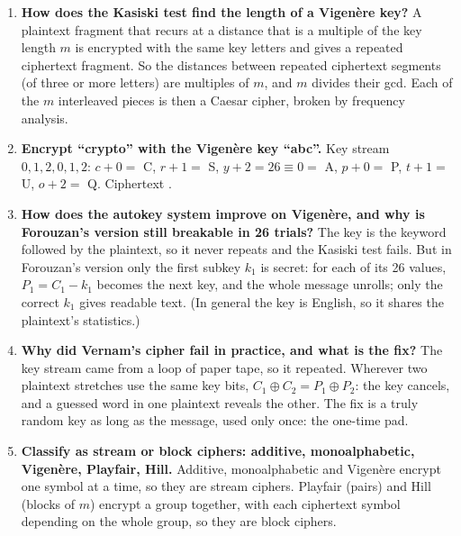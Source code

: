 \begin{enumerate}[leftmargin=1.6em,itemsep=3pt]
  \item \textbf{How does the Kasiski test find the length of a Vigen\`ere key?} A plaintext fragment that recurs at a distance that is a multiple of the key length $m$ is encrypted with the same key letters and gives a repeated ciphertext fragment. So the distances between repeated ciphertext segments (of three or more letters) are multiples of $m$, and $m$ divides their gcd. Each of the $m$ interleaved pieces is then a Caesar cipher, broken by frequency analysis.
  \item \textbf{Encrypt ``crypto'' with the Vigen\`ere key ``abc''.} Key stream $0, 1, 2, 0, 1, 2$: $c{+}0 = $ C, $r{+}1 = $ S, $y{+}2 = 26 \equiv 0 = $ A, $p{+}0 = $ P, $t{+}1 = $ U, $o{+}2 = $ Q. Ciphertext \textbf{}.
  \item \textbf{How does the autokey system improve on Vigen\`ere, and why is Forouzan's version still breakable in 26 trials?} The key is the keyword followed by the plaintext, so it never repeats and the Kasiski test fails. But in Forouzan's version only the first subkey $k_1$ is secret: for each of its 26 values, $P_1 = C_1 - k_1$ becomes the next key, and the whole message unrolls; only the correct $k_1$ gives readable text. (In general the key is English, so it shares the plaintext's statistics.)
  \item \textbf{Why did Vernam's cipher fail in practice, and what is the fix?} The key stream came from a loop of paper tape, so it repeated. Wherever two plaintext stretches use the same key bits, $C_1 \oplus C_2 = P_1 \oplus P_2$: the key cancels, and a guessed word in one plaintext reveals the other. The fix is a truly random key as long as the message, used only once: the one-time pad.
  \item \textbf{Classify as stream or block ciphers: additive, monoalphabetic, Vigen\`ere, Playfair, Hill.} Additive, monoalphabetic and Vigen\`ere encrypt one symbol at a time, so they are stream ciphers. Playfair (pairs) and Hill (blocks of $m$) encrypt a group together, with each ciphertext symbol depending on the whole group, so they are block ciphers.
\end{enumerate}
